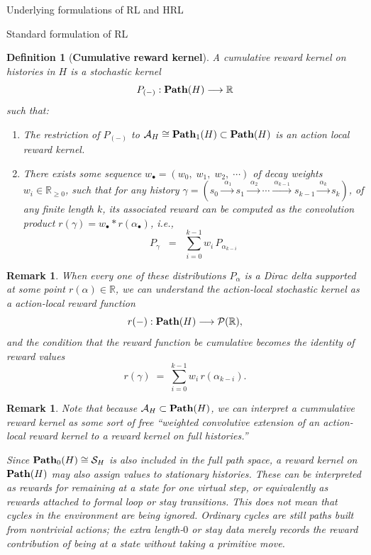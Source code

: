 \documentclass[11pt]{article}
\newtheorem{definition}[subsubsection]{Definition}
\newtheorem{remark}[subsubsection]{Remark}
\begin{document}
\begin{section}{Underlying formulations of RL and HRL}
\begin{subsection}{Standard formulation of RL}
\begin{definition}[{\bf Cumulative reward kernel}]
A {\em cumulative reward kernel} on histories in $H$ is a stochastic kernel
$$
P_{(-)}:\bold{Path}(H)\longrightarrow \mathbb{R}
$$
such that:
\begin{enumerate}
\item
The restriction of $P_{(-)}$ to $\mathcal{A}_{H}\cong\bold{Path}_{1}(H)\subset\bold{Path}(H)$ is an action local reward kernel.
\item
There exists some sequence $w_{\bullet}=(w_{0}, \;w_{1},\;w_{2},\;\cdots)$ of {\em decay weights} $w_{i}\in\mathbb{R}_{\ge0}$, such that for any history $\gamma=(s_{0}\xrightarrow{\ \ \alpha_{1}\ }s_{1}\xrightarrow{\ \ \alpha_{2}\ }\cdots\xrightarrow{\ \alpha_{k-1}\ }s_{k-1}\xrightarrow{\ \alpha_{k}\ }s_{k})$, of any finite length $k$, its associated reward can be computed as the convolution product $r(\gamma)=w_{\bullet}\ast r(\alpha_{\bullet})$, i.e.,
$$
    P_{\gamma}\;\;=\;\;\sum_{i=0}^{k-1} w_{i}\,P_{\alpha_{k-i}}
$$
\end{enumerate}
\end{definition}

\begin{remark}
\normalfont
When every one of these distributions $P_{\!\alpha}$ is a Dirac delta supported at some point $r(\alpha)\in\mathbb{R}$, we can understand the action-local stochastic kernel as a {\em action-local reward function}
$$
r(-):\bold{Path}(H)\longrightarrow\mathcal{P}(\mathbb{R}),
$$
and the condition that the reward function be cumulative becomes the identity of reward values
$$
    r(\gamma)\;=\;\sum_{i=0}^{k-1} w_{i}\,r(\alpha_{k-i}).
$$
\end{remark}

\begin{remark}
\normalfont
Note that because $\mathcal{A}_{H}\subset\bold{Path}(H)$, we can interpret a cummulative reward kernel as some sort of free ``weighted convolutive extension of an action-local reward kernel to a reward kernel on full histories.''

Since $\bold{Path}_{0}(H)\cong\mathcal{S}_{H}$ is also included in the full path space, a reward kernel on $\bold{Path}(H)$ may also assign values to stationary histories. These can be interpreted as rewards for remaining at a state for one virtual step, or equivalently as rewards attached to formal loop or stay transitions. This does not mean that cycles in the environment are being ignored. Ordinary cycles are still paths built from nontrivial actions; the extra length-$0$ or stay data merely records the reward contribution of being at a state without taking a primitive move.
\end{remark}
 

\end{subsection}
\end{section}
\end{document}
